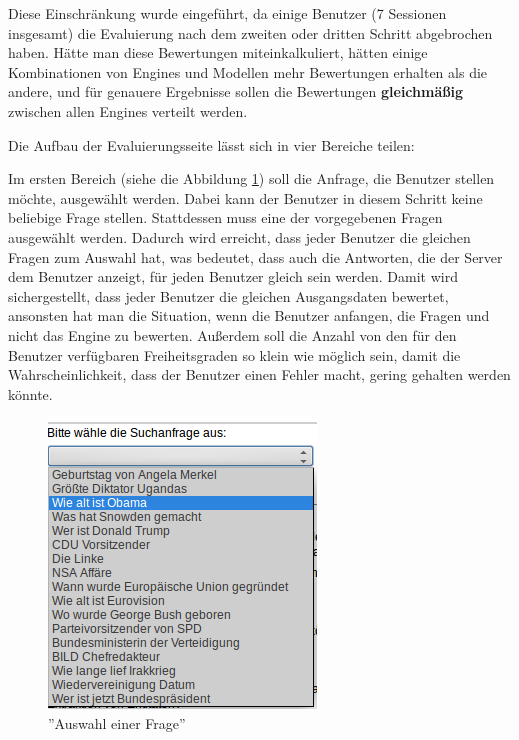 Diese Einschränkung wurde eingeführt, da einige Benutzer (7 Sessionen insgesamt) die Evaluierung nach dem zweiten oder dritten Schritt abgebrochen haben. Hätte man diese Bewertungen miteinkalkuliert, hätten einige Kombinationen von Engines und Modellen mehr Bewertungen erhalten als die andere, und für genauere Ergebnisse sollen die Bewertungen \textbf{gleichmäßig} zwischen allen Engines verteilt werden.

Die Aufbau der Evaluierungsseite lässt sich in vier Bereiche teilen:

Im ersten Bereich (siehe die Abbildung \ref{fig:eval-select-question}) soll die Anfrage, die Benutzer stellen möchte, ausgewählt werden. Dabei kann der Benutzer in diesem Schritt keine beliebige Frage stellen. Stattdessen muss eine der vorgegebenen Fragen ausgewählt werden. Dadurch wird erreicht, dass jeder Benutzer die gleichen Fragen zum Auswahl hat, was bedeutet, dass auch die Antworten, die der Server dem Benutzer anzeigt, für jeden Benutzer gleich sein werden. Damit wird sichergestellt, dass jeder Benutzer die gleichen Ausgangsdaten bewertet, ansonsten hat man die Situation, wenn die Benutzer anfangen, die Fragen und nicht das Engine zu bewerten. Außerdem soll die Anzahl von den für den Benutzer verfügbaren Freiheitsgraden so klein wie möglich sein, damit die Wahrscheinlichkeit, dass der Benutzer einen Fehler macht, gering gehalten werden könnte.

\begin{figure}
\centering
\includegraphics[width=.6\textwidth]{Bilder/select-question.png}
\caption{''Auswahl einer Frage''}
\label{fig:eval-select-question}
\end{figure}

